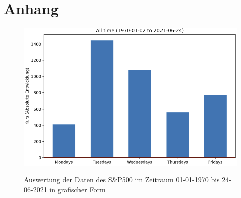 \section*{Anhang}

\anhangsverzeichnis


\begin{figure}[hbt]
    \centering
    \begin{minipage}[t]{.95\textwidth}
        \caption[]{Auswertung der Daten des S\&P500 im Zeitraum 01-01-1970 bis 24-06-2021 in grafischer Form}
        \includegraphics[width=1\textwidth]{img/Auswertung_SP500_1970-2021.PNG}\\
        \label{fig:auswertung_sp500_graph}
    \end{minipage}
\end{figure}

\clearpage


